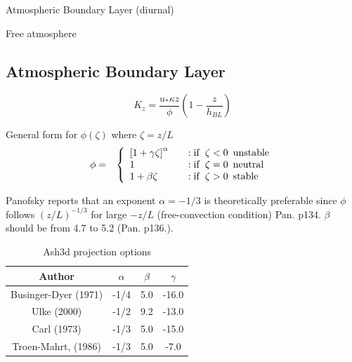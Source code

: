 Atmospheric Boundary Layer (diurnal)

Free atmosphere


\subsection{Atmospheric Boundary Layer}
\begin{equation}
K_z = \frac{u_{*} \kappa z}{\phi} \left( 1-\frac{z}{h_{BL}} \right)
\end{equation}

General form for $\phi(\zeta)$ where $\zeta = z/L$
\begin{eqnarray}\label{EqPhiB}
\phi &=& \left\{ \begin{array} {l@{\quad \quad}l}
 \left[ 1+\gamma \zeta\right]^{\alpha}  &:  \mathrm{if}\,\,\, \zeta < 0 \,\,\, \mathrm{unstable} \\
1                                       &:  \mathrm{if}\,\,\, \zeta = 0 \,\,\, \mathrm{neutral} \\
1 + \beta \zeta                         &:  \mathrm{if}\,\,\, \zeta > 0 \,\,\, \mathrm{stable}
\end{array}
\right.
\end{eqnarray}

Panofsky reports that an exponent $\alpha=-1/3$ is theoretically preferable
since $\phi$ follows $(z/L)^{-1/3}$ for large $-z/L$ (free-convection condition) Pan. p134.
$\beta$ should be from 4.7 to 5.2 (Pan. p136.).

\small
\begin{table}[htbp]
\begin{center}
\begin{tabular}{| c | c | c | c |}
\hline
Author & $\alpha$ & $\beta$ & $\gamma$\\
\hline
Businger-Dyer (1971)     & -1/4 & 5.0 & -16.0 \\
Ulke (2000)                & -1/2 & 9.2 & -13.0 \\
Carl (1973)                & -1/3 & 5.0 & -15.0 \\
Troen-Mahrt, (1986)            & -1/3 & 5.0 & -7.0  \\
\hline
\end{tabular}
\caption{\label{tab:ProjOpt}Ash3d projection options}
\end{center}
\end{table}
\normalsize



